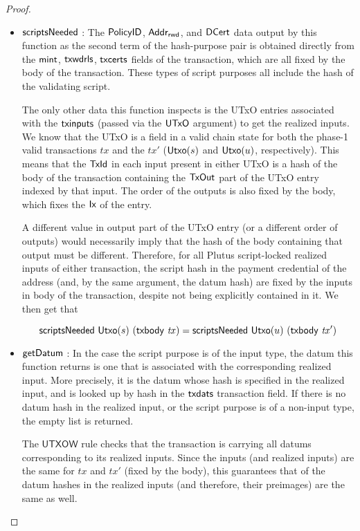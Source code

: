 \begin{property}
\begin{proof}
    \begin{itemize}
      \item $\mathsf{scriptsNeeded}$ : The $\mathsf{PolicyID}$, $\mathsf{Addr_{rwd}}$, and $\mathsf{DCert}$ data
      output by this function as the second term of the hash-purpose pair
      is obtained directly from the $\mathsf{mint}$, $\mathsf{txwdrls}$,
      $\mathsf{txcerts}$ fields of the transaction, which are all fixed by the
      body of the transaction. These types of script purposes all include
      the hash of the validating script.

      The only other data this function inspects is the UTxO entries associated
      with the $\mathsf{txinputs}$ (passed via the $\mathsf{UTxO}$ argument) to get the realized inputs.
      We know that the UTxO is a field in a valid chain state for both the phase-1 valid
      transactions $tx$ and
      the $tx'$ ($\mathsf{Utxo}(s)$ and $\mathsf{Utxo}(u)$, respectively). This means that the $\mathsf{TxId}$
      in each input present in either UTxO is a hash of the body of the transaction
      containing the $\mathsf{TxOut}$ part of the UTxO entry indexed by that input. The
      order of the outputs is also fixed by the body, which fixes the $\mathsf{Ix}$ of
      the entry.

      A different value in output part of the UTxO entry (or a different order of
      outputs) would necessarily imply
      that the hash of the body containing that output must be different.
      Therefore, for all Plutus script-locked realized inputs of either transaction,
      the script hash in the payment credential of the address
      (and, by the same argument, the datum hash) are fixed by the inputs in body of the
      transaction, despite not being explicitly contained in it. We then get that

      \[ \mathsf{scriptsNeeded}~\mathsf{Utxo}(s)~(\mathsf{txbody}~ \mathit{tx}) = \mathsf{scriptsNeeded}~\mathsf{Utxo}(u)~(\mathsf{txbody}~ \mathit{tx'}) \]

      \item $\mathsf{getDatum}$ : In the case the script purpose
      is of the input type, the datum this function returns is one that
      is associated with the corresponding realized input. More precisely, it is the datum whose
      hash is specified in the realized input, and is looked up by hash in the $\mathsf{txdats}$
      transaction field. If there is no datum hash in the realized input, or the script purpose
      is of a non-input type, the empty list is returned.

      The $\mathsf{UTXOW}$ rule checks that the transaction is carrying all datums corresponding
      to its realized inputs. Since the inputs (and realized inputs) are the same
      for $tx$ and $tx'$ (fixed by the body), this guarantees that
      of the datum hashes in the realized inputs (and therefore, their preimages)
      are the same as well.


\end{itemize}
\end{proof}
\end{property}
